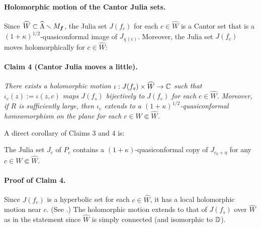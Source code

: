 \paragraph{\bf Holomorphic motion of the Cantor Julia sets.}
Since 
$\widehat{W} \subset \widehat{\Lambda} \smallsetminus M_{{\boldsymbol{f}}}$,
the Julia set $J(f_c)$ for each $c \in \widehat{W}$
is a Cantor set that is a $(1+\kappa)^{1/2}$-quasiconformal image of $J_{\chi(c)}$.
Moreover, the Julia set $J(f_c)$ moves holomorphically for $c \in \widehat{W}$:

\medskip 
\paragraph{\bf Claim 4 (Cantor Julia moves a little).}
{\it
There exists a holomorphic motion $\iota: J(f_s) \times \widehat{W} \to \mathbb C$
such that 
$\iota_c(z):=\iota(z,c)$ maps $J(f_s)$ bijectively to 
$J(f_c)$ for each $c \in  \widehat{W}$. 
Moreover, if $R$ is sufficiently large,
then $\iota_c$ extends to a $(1+\kappa)^{1/2}$-quasiconformal homeomorphism on the plane 
for each $c \in W \Subset \widehat{W}$.
}

\medskip 
A direct corollary of Claims 3 and 4 is:

\begin{cor}\label{cor_almost_conformal_copy_of_J}
The Julia set $J_c$ of $P_c$ contains a
$(1+\kappa)$-quasiconformal copy of $J_{c_0+\eta}$
for any $c \in W  \Subset \widehat{W}$.
\end{cor}


\paragraph{\bf Proof of Claim 4.}
Since $J(f_c)$ is a hyperbolic set for each $c \in  \widehat{W}$,
 it has a local holomorphic motion near $c$. 
 (See \cite[p.229]{Shishikura 1998}.)
The holomorphic motion extends to that of 
$J(f_s)$ over $\widehat{W}$ 
as in the statement 
since $\widehat{W}$ is simply connected (and isomorphic to $\mathbb D$). 

